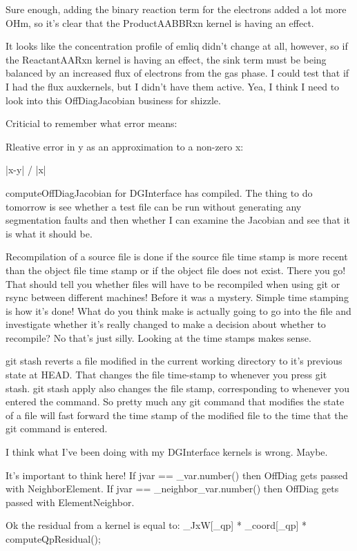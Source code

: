 {Sure enough, adding the binary reaction term for the electrons added a lot more OHm, so it's clear that the ProductAABBRxn kernel is having an effect.

It looks like the concentration profile of emliq didn't change at all, however, so if the ReactantAARxn kernel is having an effect, the sink term must be being balanced by an increased flux of electrons from the gas phase. I could test that if I had the flux auxkernels, but I didn't have them active. Yea, I think I need to look into this OffDiagJacobian business for shizzle.

Criticial to remember what error means:

Rleative error in y as an approximation to a non-zero x:

|x-y| / |x|

computeOffDiagJacobian for DGInterface has compiled. The thing to do tomorrow is see whether a test file can be run without generating any segmentation faults and then whether I can examine the Jacobian and see that it is what it should be.

Recompilation of a source file is done if the source file time stamp is more recent than the object file time stamp or if the object file does not exist. There you go! That should tell you whether files will have to be recompiled when using git or rsync between different machines! Before it was a mystery. Simple time stamping is how it's done! What do you think make is actually going to go into the file and investigate whether it's really changed to make a decision about whether to recompile? No that's just silly. Looking at the time stamps makes sense.

git stash reverts a file modified in the current working directory to it's previous state at HEAD. That changes the file time-stamp to whenever you press git stash. git stash apply also changes the file stamp, corresponding to whenever you entered the command. So pretty much any git command that modifies the state of a file will fast forward the time stamp of the modified file to the time that the git command is entered.

I think what I've been doing with my DGInterface kernels is wrong. Maybe.

It's important to think here! If jvar == _var.number() then OffDiag gets passed with NeighborElement. If jvar == _neighbor_var.number() then OffDiag gets passed with ElementNeighbor.

Ok the residual from a kernel is equal to: _JxW[_qp] * _coord[_qp] * computeQpResidual();

}

